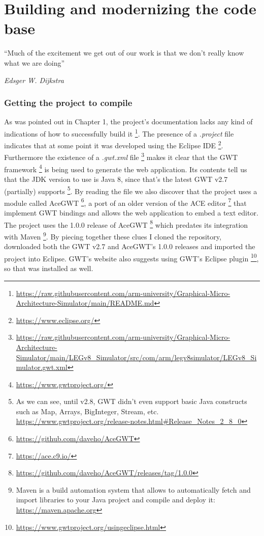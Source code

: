 \chapter{Building and modernizing the code base}\label{chap:sit}

\epigraph{``Much of the excitement we get out of our work is that we don't really know what we are doing''}{\textit{Edsger W. Dijkstra}}

\subsection*{Getting the project to compile}

As was pointed out in Chapter 1, the project's documentation lacks any kind of indications of how to successfully build it \footnote{\url{https://raw.githubusercontent.com/arm-university/Graphical-Micro-Architecture-Simulator/main/README.md}}.
The presence of a \emph{.project} file indicates that at some point it was developed using the Eclipse IDE \footnote{\url{https://www.eclipse.org/}}. Furthermore the existence of a \emph{.gwt.xml} file \footnote{\url{https://raw.githubusercontent.com/arm-university/Graphical-Micro-Architecture-Simulator/main/LEGv8_Simulator/src/com/arm/legv8simulator/LEGv8_Simulator.gwt.xml}} makes it clear that the GWT framework \footnote{\url{https://www.gwtproject.org/}} is being used to generate the web application. Its contents tell us that the JDK version to use is Java 8, since that's the latest GWT v2.7 (partially) supports \footnote{As we can see, until v2.8, GWT didn't even support basic Java constructs such as Map, Arrays, BigInteger, Stream, etc. \url{https://www.gwtproject.org/release-notes.html#Release_Notes_2_8_0}}. By reading the file we also discover that the project uses a module called AceGWT \footnote{\url{https://github.com/daveho/AceGWT}}, a port of an older version of the ACE editor \footnote{\url{https://ace.c9.io/}} that implement GWT bindings and allows the web application to embed a text editor. The project uses the 1.0.0 release of AceGWT \footnote{\url{https://github.com/daveho/AceGWT/releases/tag/1.0.0}} which predates its integration with Maven \footnote{Maven is a build automation system that allows to automatically fetch and import libraries to your Java project and compile and deploy it: \url{https://maven.apache.org}}.
\newline
By piecing together these clues I cloned the repository, downloaded both the GWT v2.7 and AceGWT's 1.0.0 releases and imported the project into Eclipse. GWT's website also suggests using GWT's Eclipse plugin \footnote{\url{https://www.gwtproject.org/usingeclipse.html}}, so that was installed as well.
